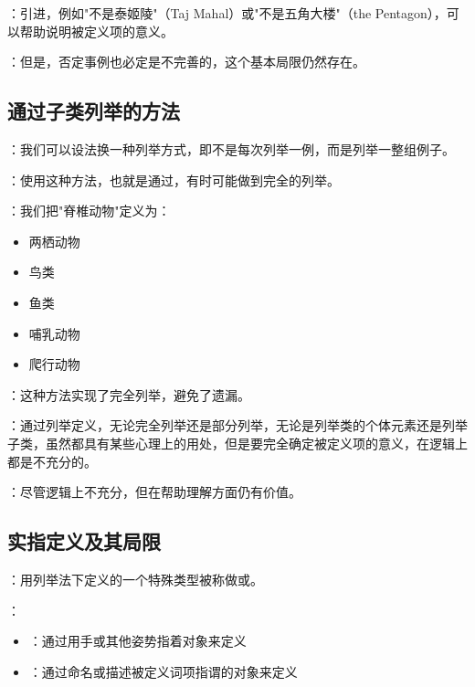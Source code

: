 \begin{theorembox}[title=反面事例的局限性]
：引进，例如"不是泰姬陵"（Taj Mahal）或"不是五角大楼"（the Pentagon），可以帮助说明被定义项的意义。

：但是，否定事例也必定是不完善的，这个基本局限仍然存在。
\end{theorembox}

\subsection{通过子类列举的方法}

\begin{theorembox}[title=子类列举方法]
：我们可以设法换一种列举方式，即不是每次列举一例，而是列举一整组例子。

：使用这种方法，也就是通过，有时可能做到完全的列举。
\end{theorembox}

\begin{examplebox}[title=脊椎动物的子类定义]
：我们把"脊椎动物"定义为：
\begin{itemize}
  \item 两栖动物
  \item 鸟类
  \item 鱼类
  \item 哺乳动物
  \item 爬行动物
\end{itemize}

：这种方法实现了完全列举，避免了遗漏。
\end{examplebox}

\begin{theorembox}[title=列举定义的总体评价]
：通过列举定义，无论完全列举还是部分列举，无论是列举类的个体元素还是列举子类，虽然都具有某些心理上的用处，但是要完全确定被定义项的意义，在逻辑上都是不充分的。

：尽管逻辑上不充分，但在帮助理解方面仍有价值。
\end{theorembox}

\subsection{实指定义及其局限}

\begin{theorembox}[title=实指定义的基本概念]
：用列举法下定义的一个特殊类型被称做或。

：
\begin{itemize}
  \item {}：通过用手或其他姿势指着对象来定义
  \item {}：通过命名或描述被定义词项指谓的对象来定义
\end{itemize}
\end{theorembox}

